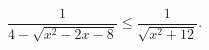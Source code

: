 \begin{ex}[type=inequality]
	\begin{condition}
		$ \dfrac{1}{4 - \sqrt{x^2 - 2x - 8}}\leqslant\dfrac{1}{\sqrt{x^2 + 12}}.$
	\end{condition}
\end{ex}
